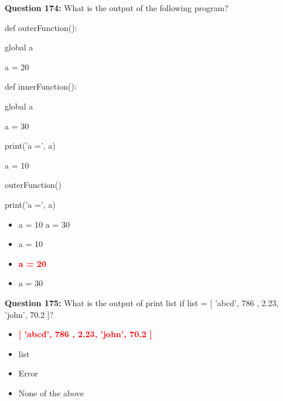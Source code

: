 \documentclass[12pt,a4paper]{article}
\begin{document}
\vspace{0.5cm}

\textbf{Question 174:} What is the output of the following program?\newline

\newline
\newline

\newline
def outerFunction():\newline

\newline
    global a\newline

\newline
    a = 20\newline

\newline
    def innerFunction():\newline

\newline
        global a\newline

\newline
        a = 30\newline

\newline
        print('a =', a)\newline

\newline
a = 10\newline

\newline
outerFunction()\newline

\newline
print('a =', a)

\begin{itemize}
    \item[\textbf{A.}] a = 10 a = 30
    \item[\textbf{B.}] a = 10
    \item[\textbf{C.}] \textcolor{red}{\textbf{a = 20}}
    \item[\textbf{D.}] a = 30
\end{itemize}

\vspace{0.5cm}

\textbf{Question 175:} What is the output of print list if list = [ 'abcd', 786 , 2.23, 'john', 70.2 ]?

\begin{itemize}
    \item[\textbf{A.}] \textcolor{red}{\textbf{[ 'abcd', 786 , 2.23, 'john', 70.2 ]}}
    \item[\textbf{B.}] list
    \item[\textbf{C.}] Error
    \item[\textbf{D.}] None of the above
\end{itemize}
\end{document}
